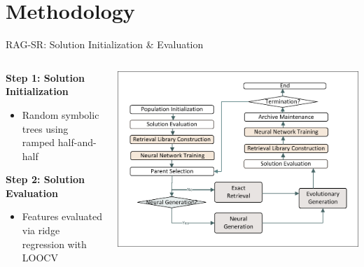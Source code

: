\documentclass[aspectratio=1610]{beamer}
\begin{document}
    \section{Methodology}

    \begin{frame}{RAG-SR: Solution Initialization \& Evaluation}
        \begin{columns}
            \begin{column}{0.5\textwidth}
                \textbf{Step 1: Solution Initialization}
                \begin{itemize}
                    \item Random symbolic trees using ramped half-and-half
                \end{itemize}

                \vspace{0.3cm}
                \textbf{Step 2: Solution Evaluation}
                \begin{itemize}
                    \item Features evaluated via ridge regression with LOOCV
                \end{itemize}
            \end{column}
            \begin{column}{0.5\textwidth}
                \includegraphics[width=1.0\textwidth]{figs/Workflow.pdf}
            \end{column}
        \end{columns}
    \end{frame}
\end{document}
